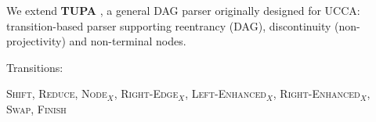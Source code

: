 \documentclass[a0,portrait]{a0poster}
\begin{document}
\begin{multicols}{2}


\color{Black}
    
\begin{tcolorbox}
We extend \textbf{TUPA} \cite{hershcovich2017a,hershcovich2018multitask}, a general DAG parser
originally designed for UCCA:
transition-based parser supporting reentrancy (DAG),
discontinuity (non-projectivity) and non-terminal nodes.

\vspace{5mm}
Transitions:

\begin{adjustbox}{margin=3mm,frame,bgcolor=white}
\textsc{Shift, Reduce, Node$_X$, Right-Edge$_X$, Left-Enhanced$_X$, Right-Enhanced$_X$, Swap, Finish}
\end{adjustbox}

\vspace{5mm}


\end{tcolorbox}
\end{multicols}
\end{document}
